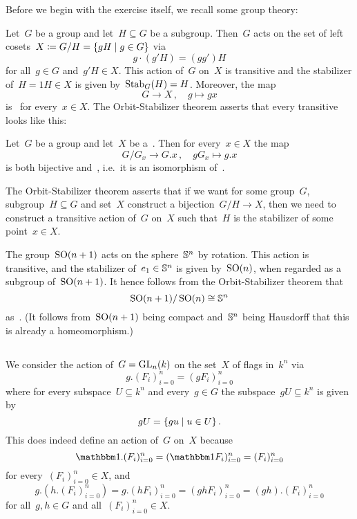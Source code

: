 \section{}

Before we begin with the exercise itself, we recall some group theory:

Let~$G$ be a group and let~$H \subseteq G$ be a subgroup.
Then~$G$ acts on the set of left cosets~$X \defined G/H = \{ gH \suchthat g \in G\}$ via
\[
    g \cdot (g' H)
  = (g g') H
\]
for all~$g \in G$ and~$g'H \in X$.
This action of~$G$ on~$X$ is transitive and the stabilizer of~$H = 1H \in X$ is given by~$\operatorname{Stab}_G(H) = H$.
Moreover, the map
\[
          G
  \to     X \,,
  \quad   g
  \mapsto gx
\]
is~ for every~$x \in X$.
The Orbit-Stabilizer theorem asserts that every transitive~ looks like this:

\begin{theorem}
  Let~$G$ be a group and let~$X$ be a~.
  Then for every~$x \in X$ the map
  \[
            G/G_x
    \to     G.x \,,
    \quad   gG_x
    \mapsto g.x
  \]
  is both bijective and~, i.e.\ it is an isomorphism of~.
\end{theorem}

The Orbit-Stabilizer theorem asserts that if we want for some group~$G$, subgroup~$H \subseteq G$ and set~$X$ construct a bijection~$G/H \to X$, then we need to construct a transitive action of~$G$ on~$X$ such that~$H$ is the stabilizer of some point~$x \in X$.

\begin{example}[Topology]
  The group~$\operatorname{SO}(n+1)$ acts on the sphere~$\mathbb{S}^n$ by rotation.
  This action is transitive, and the stabilizer of~$e_1 \in \mathbb{S}^n$ is given by~$\operatorname{SO}(n)$, when regarded as a subgroup of~$\operatorname{SO}(n+1)$.
  It hence follows from the Orbit-Stabilizer theorem that
  \[
          \operatorname{SO}(n+1)/\operatorname{SO}(n)
    \cong \mathbb{S}^n
  \]
  as~.
  (It follows from~$\operatorname{SO}(n+1)$ being compact and~$\mathbb{S}^n$ being Hausdorff that this is already a homeomorphism.)
\end{example}





\subsection{}

We consider the action of~$G = \operatorname{GL}_n(k)$ on the set~$X$ of flags in~$k^n$ via
\[
    g . (F_i)_{i=0}^n
  = ( gF_i )_{i=0}^n
\]
where for every subspace~$U \subseteq k^n$ and every~$g \in G$ the subspace~$gU \subseteq k^n$ is given by
\[
    gU
  = \{ g u \suchthat u \in U \} \,.
\]
This does indeed define an action of~$G$ on~$X$ because
\[
    \Id.(F_i)_{i=0}^n
  = (\Id F_i)_{i=0}^n
  = (F_i)_{i=0}^n
\]
for every~$(F_i)_{i=0}^n \in X$, and
\[
    g.(h.(F_i)_{i=0}^n)
  = g.(h F_i)_{i=0}^n
  = (g h F_i)_{i=0}^n
  = (gh).(F_i)_{i=0}^n
\]
for all~$g, h \in G$ and all~$(F_i)_{i=0}^n \in X$.

